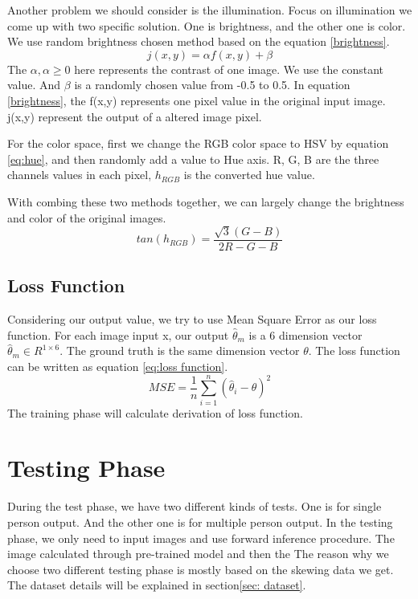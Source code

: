 \documentclass[senior]{IPSstyle}
\begin{document}
Another problem we should consider is the illumination.
Focus on illumination we come up with two specific solution.
One is brightness, and the other one is color.
We use random brightness chosen method based on the equation \ref{brightness}.
\begin{equation}\label{brightness}
    j(x, y) = \alpha f(x, y) + \beta
\end{equation}
The $\alpha, \alpha \geq 0$ here represents the contrast of one image.
We use the constant value.
And $\beta$ is a randomly chosen value from -0.5 to 0.5.
In equation \ref{brightness}, the f(x,y) represents one pixel value in the original input image.
j(x,y) represent the output of a altered image pixel.

For the color space, first we change the RGB color space to HSV by equation \ref{eq:hue}, and then randomly add a value to Hue axis.
R, G, B are the three channels values in each pixel, $h_{RGB}$ is the converted hue value.

With combing these two methods together, we can largely change the brightness and color of the original images. 
\begin{equation}\label{eq:hue}
    tan(h_{RGB}) = \frac{\sqrt{3}(G-B)}{2R-G-B}
\end{equation}

\subsection{Loss Function}
Considering our output value, we try to use Mean Square Error as our loss function.
For each image input x, our output $\hat{\theta}_m$ is a 6 dimension vector $\hat{\theta}_m\in R^{1\times 6}$.
The ground truth is the same dimension vector $\theta$.
The loss function can be written as equation \ref{eq:loss function}.
\begin{equation}\label{eq:loss function}
    MSE=\frac{1}{n}\sum_{i=1}^n (\hat{\theta}_i - \theta)^2
\end{equation}
The training phase will calculate derivation of loss function.

\section{Testing Phase} \label{testing phase}
During the test phase, we have two different kinds of tests.
One is for single person output.
And the other one is for multiple person output.
In the testing phase, we only need to input images and use forward inference procedure.
The image calculated through pre-trained model and then the 
The reason why we choose two different testing phase is mostly based on the skewing data we get.
The dataset details will be explained in section\ref{sec: dataset}.
\end{document}
